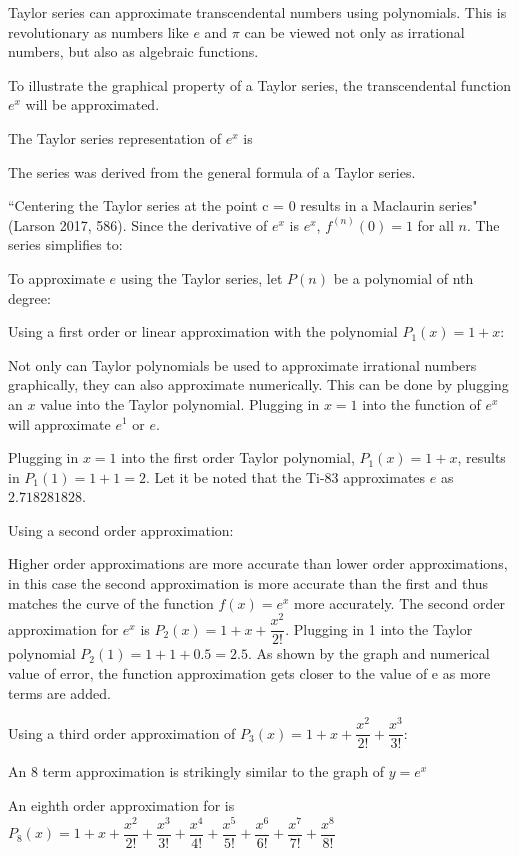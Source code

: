 Taylor series can approximate transcendental numbers using polynomials. This is revolutionary as numbers like \(e\) and \(\pi\) can be viewed not only as irrational numbers, but also as algebraic functions.

To illustrate the graphical property of a Taylor series, the transcendental function \(e^{x}\) will be approximated.

The Taylor series representation of \(e^{x}\) is  

The series was derived from the general formula of a Taylor series.

``Centering the Taylor series at the point c = 0 results in a Maclaurin series" (Larson 2017, 586). Since the derivative of \(e^{x}\) is \(e^{x}\), \(f^{(n)}(0) = 1\) for all \(n\). The series simplifies to:

To approximate \(e\) using the Taylor series, let \(P(n)\) be a polynomial of nth degree:

Using a first order or linear approximation with the polynomial \(P_{1}(x) = 1 + x\):

Not only can Taylor polynomials be used to approximate irrational numbers graphically, they can also approximate numerically. This can be done by plugging an \(x\) value into the Taylor polynomial. Plugging in \(x = 1\) into the function of \(e^x\) will  approximate \(e^1\) or \(e\). 

Plugging in \(x = 1\) into the first order Taylor polynomial, \(P_{1}(x) = 1 + x\), results in \(P_{1}(1) = 1 + 1 = 2\). Let it be noted that the Ti-83 approximates \(e\) as \(2.718281828\).

Using a second order approximation:


Higher order approximations are more accurate than lower order approximations, in this case the second approximation is more accurate than the first and thus matches the curve of the function \(f(x) = e^{x}\) more accurately. The second order approximation for \(e^{x}\) is \(P_{2}(x) = 1 + x + \dfrac{x^2}{2!}\). Plugging in 1 into the Taylor polynomial \(P_{2}(1) = 1 + 1 + 0.5 = 2.5\). As shown by the graph and numerical value of error, the function approximation gets closer to the value of e as more terms are added.

Using a third order approximation of \(P_{3}(x) = 1 + x + \dfrac{x^{2}}{2!} + \dfrac{x^{3}}{3!}\):

An 8 term approximation is strikingly similar to the graph of \(y = e^{x}\)

An eighth order approximation for is \(P_{8}(x) = 1 + x + \dfrac{x^2}{2!} + \dfrac{x^3}{3!} + \dfrac{x^4}{4!} + \dfrac{x^5}{5!} + \dfrac{x^6}{6!} + \dfrac{x^7}{7!} + \dfrac{x^8}{8!}\)

